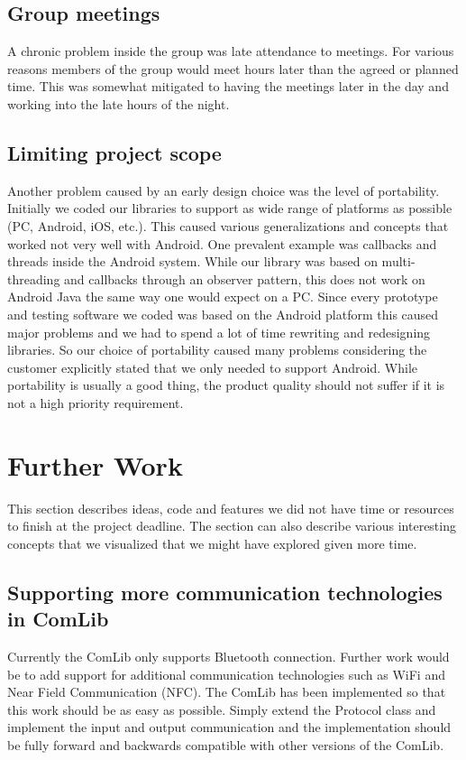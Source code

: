 \subsection{Group meetings}
A chronic problem inside the group was late attendance to meetings. For various reasons members of
the group would meet hours later than the agreed or planned time. This was somewhat mitigated to having 
the meetings later in the day and working into the late hours of the night.

\subsection{Limiting project scope}
Another problem caused by an early design choice was the level of portability. Initially we coded our libraries 
to support as wide range of platforms as possible (PC, Android, iOS, etc.). This caused various generalizations
and concepts that worked not very well with Android. One prevalent example was callbacks and threads
inside the Android system. While our library was based on multi-threading and callbacks through an observer
pattern, this does not work on Android Java the same way one would expect on a PC. Since every prototype
and testing software we coded was based on the Android platform this caused major problems and we had
to spend a lot of time rewriting and redesigning libraries. So our choice of portability caused many problems
considering the customer explicitly stated that we only needed to support Android. While portability is usually a
good thing, the product quality should not suffer if it is not a high priority requirement.

\section{Further Work}
This section describes ideas, code and features we did not have time or resources to
finish at the project deadline. The section can also describe various interesting concepts 
that we visualized that we might have explored given more time.

\subsection{Supporting more communication technologies in ComLib}
Currently the ComLib only supports Bluetooth connection. Further work would be
to add support for additional communication technologies such as WiFi and Near Field 
Communication (NFC). The ComLib has been implemented so that this work should
be as easy as possible. Simply extend the Protocol class and implement the input and
output communication and the implementation should be fully forward and backwards
compatible with other versions of the ComLib.

